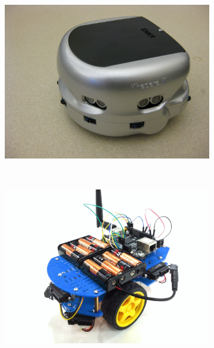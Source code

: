 \begin{figure}[h]
\centering
	\begin{subfigure}[b]{0.49\textwidth}%
		\centering%
		\includegraphics[trim= 8cm 0cm 0cm 0cm,clip,
scale=0.07]{Figuras/Khepera_III_robot}%
	\end{subfigure}%
	~
	\begin{subfigure}[b]{0.49\textwidth}%
		\centering%
		\includegraphics[trim={6cm 0cm 3cm 0cm},clip,
scale=0.045]{Figuras/quickbot-blue}%
	\end{subfigure}%
	
\end{figure}